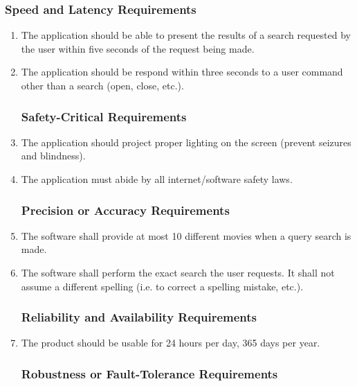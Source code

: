 \documentclass[]{article}
\begin{document}
\subsubsection{Speed and Latency Requirements}
\label{ssub:speed_and_latency_requirements}
\begin{enumerate}[{PR}1. ]
	\item The application should be able to present the results of a search requested by the user within five seconds of the request being made.
	\item The application should be respond within three seconds to a user command other than a search (open, close, etc.).

\subsubsection{Safety-Critical Requirements}
\label{ssub:safety_critical_requirements}
	\item The application should project proper lighting on the screen (prevent seizures and blindness).
	\item The application must abide by all internet/software safety laws.

\subsubsection{Precision or Accuracy Requirements}
\label{ssub:precision_or_accuracy_requirements}
	\item The software shall provide at most 10 different movies when a query search is made.
	\item The software shall perform the exact search the user requests. It shall not assume a different spelling (i.e. to correct a spelling mistake, etc.).


\subsubsection{Reliability and Availability Requirements}
\label{ssub:reliability_and_availability_requirements}
	\item The product should be usable for 24 hours per day, 365 days per year.

\subsubsection{Robustness or Fault-Tolerance Requirements}
\label{ssub:robustness_or_fault_tolerance_requirements}


\end{enumerate}
\end{document}
